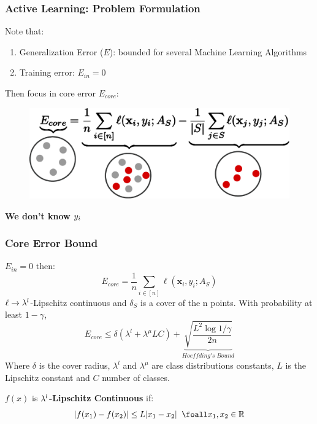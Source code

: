 \documentclass[11pts]{beamer}
\begin{document}
\begin{frame}%
\frametitle{Active Learning: Problem Formulation}
Note that:
\begin{enumerate}
    \item Generalization Error ($E$): bounded for several Machine Learning Algorithms
    \item Training error: $E_{in}= 0$
\end{enumerate}
Then focus in core error $E_{core}$: 
\begin{figure}
    \centering
    \includegraphics[scale=0.48]{IM/eq.pdf}
\end{figure}
\begin{center}
    \textcolor{UdelRed}{\textbf{We don't know $\mathnormal{y_{i}}$}}
\end{center}
\end{frame}


\begin{frame}%
\frametitle{Core Error Bound}
 $E_{in}=0$ then:
\begin{equation*}
   E_{core} = \frac{1}{n}\sum_{i\in [n]}\ell(\mathbf{x}_{i},y_{i};A_{S})
\end{equation*}
$\ell\rightarrow\lambda^{\mathnormal{l}}$-Lipschitz continuous and $\delta_{S}$  is a cover of the n points. With probability at least $1-\gamma$, 
\begin{equation}
    E_{core}\leq \delta (\lambda^{l}+\lambda^{\mu}LC)+\underbrace{\sqrt{\frac{L^{2}\log{1/\gamma}}{2n}}}_{Hoeffding's\;Bound}
\end{equation}
Where $\delta$ is the cover radius, $\lambda^{l}$ and $\lambda^{\mu}$ are  class distributions constants, $L$ is the Lipschitz constant and $C$ number of classes.

$f(x)$ is \textbf{$\lambda^{\mathnormal{l}}$-Lipschitz Continuous} if:
\begin{equation*}
    |f(x_{1})-f(x_{2})|\leq L
    |x_{1}-x_{2}| \;\; \foall x_{1},x_{2}\in \mathbb{R}
\end{equation*}

\end{frame}
\end{document}

